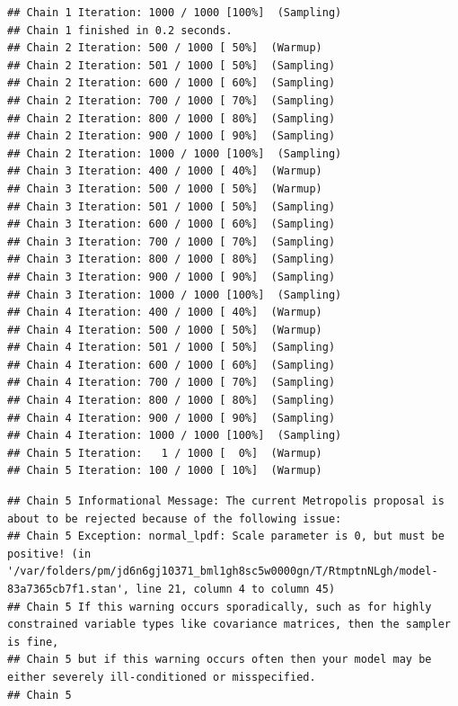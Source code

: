 \documentclass[
]{book}
\begin{document}
\begin{verbatim}
## Chain 1 Iteration: 1000 / 1000 [100%]  (Sampling) 
## Chain 1 finished in 0.2 seconds.
## Chain 2 Iteration: 500 / 1000 [ 50%]  (Warmup) 
## Chain 2 Iteration: 501 / 1000 [ 50%]  (Sampling) 
## Chain 2 Iteration: 600 / 1000 [ 60%]  (Sampling) 
## Chain 2 Iteration: 700 / 1000 [ 70%]  (Sampling) 
## Chain 2 Iteration: 800 / 1000 [ 80%]  (Sampling) 
## Chain 2 Iteration: 900 / 1000 [ 90%]  (Sampling) 
## Chain 2 Iteration: 1000 / 1000 [100%]  (Sampling) 
## Chain 3 Iteration: 400 / 1000 [ 40%]  (Warmup) 
## Chain 3 Iteration: 500 / 1000 [ 50%]  (Warmup) 
## Chain 3 Iteration: 501 / 1000 [ 50%]  (Sampling) 
## Chain 3 Iteration: 600 / 1000 [ 60%]  (Sampling) 
## Chain 3 Iteration: 700 / 1000 [ 70%]  (Sampling) 
## Chain 3 Iteration: 800 / 1000 [ 80%]  (Sampling) 
## Chain 3 Iteration: 900 / 1000 [ 90%]  (Sampling) 
## Chain 3 Iteration: 1000 / 1000 [100%]  (Sampling) 
## Chain 4 Iteration: 400 / 1000 [ 40%]  (Warmup) 
## Chain 4 Iteration: 500 / 1000 [ 50%]  (Warmup) 
## Chain 4 Iteration: 501 / 1000 [ 50%]  (Sampling) 
## Chain 4 Iteration: 600 / 1000 [ 60%]  (Sampling) 
## Chain 4 Iteration: 700 / 1000 [ 70%]  (Sampling) 
## Chain 4 Iteration: 800 / 1000 [ 80%]  (Sampling) 
## Chain 4 Iteration: 900 / 1000 [ 90%]  (Sampling) 
## Chain 4 Iteration: 1000 / 1000 [100%]  (Sampling) 
## Chain 5 Iteration:   1 / 1000 [  0%]  (Warmup) 
## Chain 5 Iteration: 100 / 1000 [ 10%]  (Warmup)
\end{verbatim}

\begin{verbatim}
## Chain 5 Informational Message: The current Metropolis proposal is about to be rejected because of the following issue:
## Chain 5 Exception: normal_lpdf: Scale parameter is 0, but must be positive! (in '/var/folders/pm/jd6n6gj10371_bml1gh8sc5w0000gn/T/RtmptnNLgh/model-83a7365cb7f1.stan', line 21, column 4 to column 45)
## Chain 5 If this warning occurs sporadically, such as for highly constrained variable types like covariance matrices, then the sampler is fine,
## Chain 5 but if this warning occurs often then your model may be either severely ill-conditioned or misspecified.
## Chain 5
\end{verbatim}
\end{document}
